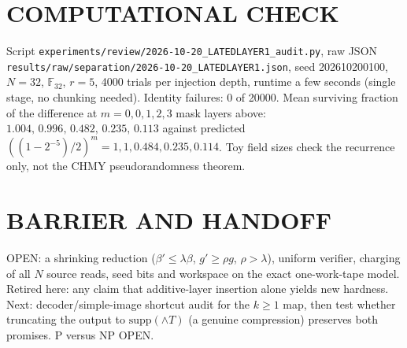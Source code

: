 \documentclass[11pt]{article}
\begin{document}
\section*{COMPUTATIONAL CHECK}
Script \texttt{experiments/review/2026-10-20\_LATEDLAYER1\_audit.py}, raw JSON \texttt{results/raw/separation/2026-10-20\_LATEDLAYER1.json}, seed 202610200100, $N=32$, $\mathbb F_{32}$, $r=5$, 4000 trials per injection depth, runtime a few seconds (single stage, no chunking needed). Identity failures: 0 of 20000. Mean surviving fraction of the difference at $m=0,0,1,2,3$ mask layers above: $1.004,\,0.996,\,0.482,\,0.235,\,0.113$ against predicted $((1-2^{-5})/2)^m=1,1,0.484,0.235,0.114$. Toy field sizes check the recurrence only, not the CHMY pseudorandomness theorem.

\section*{BARRIER AND HANDOFF}
OPEN: a shrinking reduction ($\beta'\le\lambda\beta$, $g'\ge\rho g$, $\rho>\lambda$), uniform verifier, charging of all $N$ source reads, seed bits and workspace on the exact one-work-tape model. Retired here: any claim that additive-layer insertion alone yields new hardness. Next: decoder/simple-image shortcut audit for the $k\ge1$ map, then test whether truncating the output to $\mathrm{supp}(\wedge T)$ (a genuine compression) preserves both promises. P versus NP OPEN.
\end{document}

